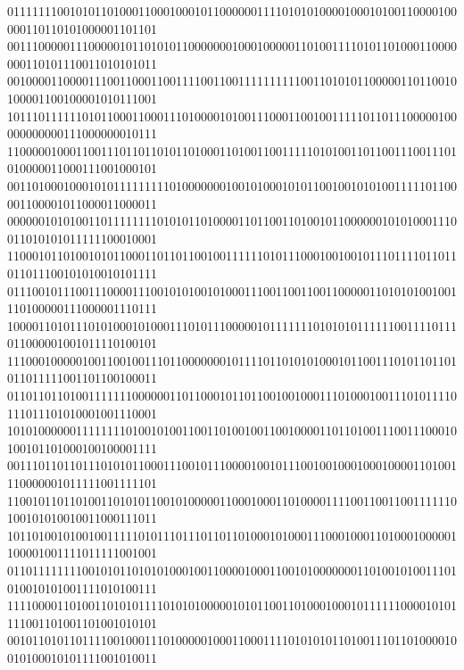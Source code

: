 \documentclass[10pt,\tflang,pdftex]{book}
\begin{document}
{{\begin{minipage}{\oldpwidth}
{{{{011111110010101101000110001000101100000011110101010000100010100110000100000110110101000001101101\\
001110000011100000101101010110000000100010000011010011110101101000110000000110101110011010101011\\
001000011000011100110001100111100110011111111110011010101100000110110010100001100100001010111001\\
101110111111010110001100011101000010100111000110010011111011011100000100000000000111000000010111\\
110000010001100111011011010110100011010011001111101010011011001110011101010000011000111001000101\\
001101000100010101111111110100000001001010001010110010010101001111101100001100001011000011000011\\
000000101010011011111111010101101000011011001101001011000000101010001110011010101011111100010001\\
110001011010010101100011011011001001111110101110001001001011101111011011011011100101010010101111\\
011100101110011100001110010101001010001110011001100110000011010101001001110100000111000001110111\\
100001101011101010001010001110101110000010111111101010101111110011110111011000001001011110100101\\
111000100000100110010011101100000001011110110101010001011001110101101101011011111001101100100011\\
011011011010011111110000001101100010110110010010001110100010011101011110111011101010001001110001\\
101010000001111111101001010011001101001001100100001101101001110011100010100101101000100100001111\\
001110110110111010101100011100101110000100101110010010001000100001101001110000001011111001111101\\
110010110110100110101011001010000011000100011010000111100110011001111110100101010010011000111011\\
101101001010010011111010111011101101101000101000111000100011010001000001100001001111011111001001\\
011011111111001010110101010001001100001000110010100000001101001010011101010010101001111010100111\\
111100001101001101010111101010100000101011001101000100010111111000010101111001101001101001010101\\
001011010110111100100011101000001000110001111010101011010011101101000010010100010101111001010011\\
}}}}
\end{minipage}}}
\end{document}
